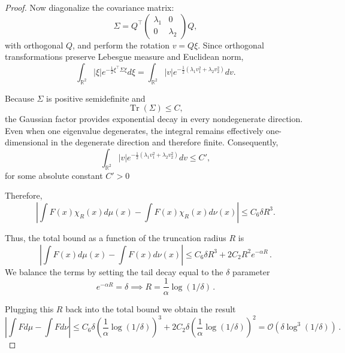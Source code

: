 \begin{proof}
    Now diagonalize the covariance matrix:
    \[
        \Sigma = Q^\top \begin{pmatrix} \lambda_1 &0\\ 0&\lambda_2 \end{pmatrix} Q,
    \]
    with orthogonal $Q$, and perform the rotation $v=Q\xi$. Since orthogonal transformations preserve Lebesgue measure and Euclidean norm,
    \[
        \int_{\mathbb R^2}|\xi| e^{-\frac12\xi^\top\Sigma\xi} d\xi = \int_{\mathbb R^2} |v| e^{-\frac12(\lambda_1v_1^2+\lambda_2v_2^2)} dv .
    \]
    
    Because $\Sigma$ is positive semidefinite and
    \[
        \operatorname{Tr}(\Sigma) \le C,
    \]
    the Gaussian factor provides exponential decay in every nondegenerate direction. Even when one eigenvalue degenerates, the integral remains effectively one-dimensional in the degenerate direction and therefore finite. Consequently,
    \[
        \int_{\mathbb R^2} |v| e^{-\frac12(\lambda_1v_1^2+\lambda_2v_2^2)} dv \le C' ,
    \]
    for some absolute constant $C' > 0$
    
    Therefore,
    \[
        \left| \int F(x)\chi_R(x)d\mu(x) - \int F(x)\chi_R(x)d\nu(x) \right| \le C_6\delta R^3 .
    \]

    Thus, the total bound as a function of the truncation radius $R$ is
    \[
        \left| \int F(x) d\mu(x) - \int F(x) d\nu(x)\right| \le C_6 \delta R^3 + 2C_2 R^2 e^{-\alpha R}\, .
    \]
    We balance the terms by setting the tail decay equal to the $\delta$ parameter
    \[
        e^{-\alpha R} = \delta \implies R = \frac{1}{\alpha} \log(1/\delta)\, .
    \]
    
    Plugging this $R$ back into the total bound we obtain the result
    \[
        \left| \int F d\mu - \int F d\nu \right| \le C_6 \delta \left( \frac{1}{\alpha} \log(1/\delta) \right)^3 + 2C_2 \delta \left( \frac{1}{\alpha} \log(1/\delta) \right)^2 = \mathcal{O}\left( \delta \log^3(1/\delta) \right)\, .
    \]
\end{proof}

